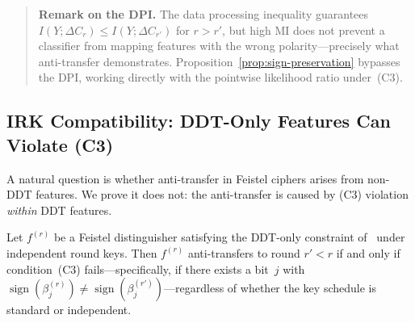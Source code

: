 \documentclass[runningheads]{llncs}
\begin{document}
\begin{quote}\small
\textbf{Remark on the DPI.}
The data processing inequality guarantees $I(Y;\Delta C_r) \leq I(Y;\Delta C_{r'})$ for $r > r'$, but high MI does not prevent a classifier from mapping features with the wrong polarity---precisely what anti-transfer demonstrates.
Proposition~\ref{prop:sign-preservation} bypasses the DPI, working directly with the pointwise likelihood ratio under~(C3).
\end{quote}

\subsection{IRK Compatibility: DDT-Only Features Can Violate (C3)}

A natural question is whether anti-transfer in Feistel ciphers arises from non-DDT features.
We prove it does not: the anti-transfer is caused by (C3) violation \emph{within} DDT features.

\begin{proposition}
\label{prop:irk}
Let $f^{(r)}$ be a Feistel distinguisher satisfying the DDT-only
constraint of\/~{\rm\cite{gohr2022assessment}} under independent round
keys.
Then $f^{(r)}$ anti-transfers to round $r' < r$ if and only if
condition~\textup{(C3)} fails---specifically, if there exists a bit~$j$
with
$\operatorname{sign}(\beta_j^{(r)}) \neq
 \operatorname{sign}(\beta_j^{(r')})$---regardless of whether the key
schedule is standard or independent.
\end{proposition}
\end{document}
